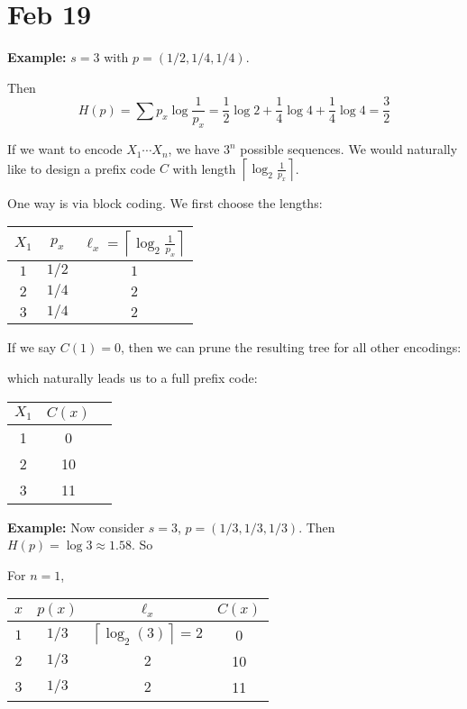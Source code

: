 \documentclass[12pt]{report}
\newcommand{\ceil}[1]{\left\lceil #1 \right\rceil}
\newcommand*{\tbf}[1]{\ifmmode\mathbf{#1}\else\textbf{#1}\fi}
\begin{document}
\section{Feb 19}
\tbf{Example:} $s = 3$ with $p = (1/2, 1/4, 1/4)$.

Then
\[H(p) = \sum p_x \log \frac{1}{p_x} = \frac{1}{2} \log 2 + \frac{1}{4} \log 4 + \frac{1}{4} \log 4 = \frac{3}{2}\]

If we want to encode $X_1\cdots X_n$, we have $3^n$ possible sequences. We would naturally like to design a prefix code $C$ with length $\ceil{\log_2 \frac{1}{p_x}}$.

One way is via block coding. We first choose the lengths:

\qquad \begin{tabular}{ccc}
    $X_1$ & $p_x$ & $\ell_x = \ceil{\log_2 \frac{1}{p_x}}$ \\\hline
    $1$   & $1/2$ & $1$                                    \\
    $2$   & $1/4$ & $2$                                    \\
    $3$   & $1/4$ & $2$
\end{tabular}

If we say $C(1) = 0$, then we can prune the resulting tree for all other encodings:
\begin{center}
\end{center}
which naturally leads us to a full prefix code:

\qquad \begin{tabular}{ccc}
    $X_1$ & $C(x)$ \\\hline
    1     & 0      \\
    2     & 10     \\
    3     & 11
\end{tabular}

\tbf{Example:} Now consider $s = 3$, $p = (1/3, 1/3, 1/3)$. Then $H(p) = \log 3 \approx 1.58$. So

For $n = 1$,

\qquad \begin{tabular}{cccc}
    $x$ & $p(x)$ & $\ell_x$               & $C(x)$ \\\hline
    $1$ & $1/3$  & $\ceil{\log_2(3)} = 2$ & 0      \\
    $2$ & $1/3$  & $2$                    & 10     \\
    $3$ & $1/3$  & $2$                    & 11
\end{tabular}
\end{document}
